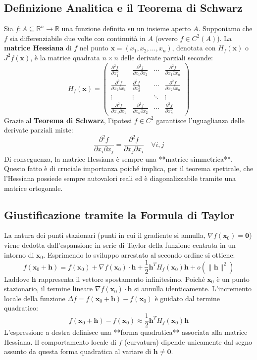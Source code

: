 \subsection{Definizione Analitica e il Teorema di Schwarz}
Sia $f: A \subseteq \mathbb{R}^n \to \mathbb{R}$ una funzione definita su un insieme aperto $A$. Supponiamo che $f$ sia differenziabile due volte con continuità in $A$ (ovvero $f \in C^2(A)$). La \textbf{matrice Hessiana} di $f$ nel punto $\mathbf{x} = (x_1, x_2, \dots, x_n)$, denotata con $H_f(\mathbf{x})$ o $J^2 f(\mathbf{x})$, è la matrice quadrata $n \times n$ delle derivate parziali seconde:
\[
H_f(\mathbf{x}) = \begin{pmatrix}
\frac{\partial^2 f}{\partial x_1^2} & \frac{\partial^2 f}{\partial x_1 \partial x_2} & \cdots & \frac{\partial^2 f}{\partial x_1 \partial x_n} \\[1.5ex]
\frac{\partial^2 f}{\partial x_2 \partial x_1} & \frac{\partial^2 f}{\partial x_2^2} & \cdots & \frac{\partial^2 f}{\partial x_2 \partial x_n} \\
\vdots & \vdots & \ddots & \vdots \\
\frac{\partial^2 f}{\partial x_n \partial x_1} & \frac{\partial^2 f}{\partial x_n \partial x_2} & \cdots & \frac{\partial^2 f}{\partial x_n^2}
\end{pmatrix}
\]
Grazie al \textbf{Teorema di Schwarz}, l'ipotesi $f \in C^2$ garantisce l'uguaglianza delle derivate parziali miste:
\[ \frac{\partial^2 f}{\partial x_i \partial x_j} = \frac{\partial^2 f}{\partial x_j \partial x_i} \quad \forall i,j \]
Di conseguenza, la matrice Hessiana è sempre una **matrice simmetrica**. Questo fatto è di cruciale importanza poiché implica, per il teorema spettrale, che l'Hessiana possiede sempre autovalori reali ed è diagonalizzabile tramite una matrice ortogonale.

\subsection{Giustificazione tramite la Formula di Taylor}
La natura dei punti stazionari (punti in cui il gradiente si annulla, $\nabla f(\mathbf{x}_0) = \mathbf{0}$) viene dedotta dall'espansione in serie di Taylor della funzione centrata in un intorno di $\mathbf{x}_0$. Esprimendo lo sviluppo arrestato al secondo ordine si ottiene:
\[ f(\mathbf{x}_0 + \mathbf{h}) = f(\mathbf{x}_0) + \nabla f(\mathbf{x}_0) \cdot \mathbf{h} + \frac{1}{2} \mathbf{h}^T H_f(\mathbf{x}_0) \mathbf{h} + o(\|\mathbf{h}\|^2) \]
Laddove $\mathbf{h}$ rappresenta il vettore spostamento infinitesimo. Poiché $\mathbf{x}_0$ è un punto stazionario, il termine lineare $\nabla f(\mathbf{x}_0) \cdot \mathbf{h}$ si annulla identicamente. L'incremento locale della funzione $\Delta f = f(\mathbf{x}_0 + \mathbf{h}) - f(\mathbf{x}_0)$ è guidato dal termine quadratico:
\[ f(\mathbf{x}_0 + \mathbf{h}) - f(\mathbf{x}_0) \approx \frac{1}{2} \mathbf{h}^T H_f(\mathbf{x}_0) \mathbf{h} \]
L'espressione a destra definisce una **forma quadratica** associata alla matrice Hessiana. Il comportamento locale di $f$ (curvatura) dipende unicamente dal segno assunto da questa forma quadratica al variare di $\mathbf{h} \neq \mathbf{0}$.

